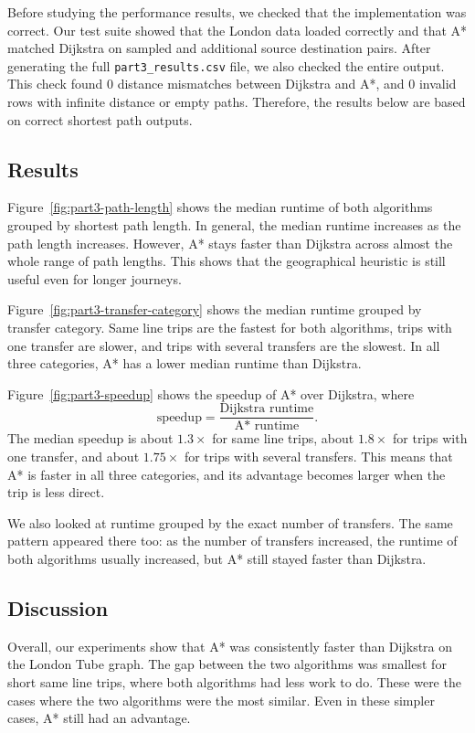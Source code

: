\documentclass[letterpaper]{article}
\theoremstyle{plain}
\theoremstyle{definition}
\theoremstyle{remark}
\newcounter{experiment}
\begin{document}
Before studying the performance results, we checked that the implementation was correct. Our test suite showed 
that the London data loaded correctly and that A* matched Dijkstra on sampled and additional 
source destination pairs. After generating the full \texttt{part3\_results.csv} file, we also checked the 
entire output. This check found \(0\) distance mismatches between Dijkstra and A*, and \(0\) invalid rows 
with infinite distance or empty paths. Therefore, the results below are based on correct shortest path outputs.

\subsection*{Results}
Figure~\ref{fig:part3-path-length} shows the median runtime of both algorithms grouped by shortest path length. 
In general, the median runtime increases as the path length increases. However, A* stays faster than Dijkstra 
across almost the whole range of path lengths. This shows that the geographical heuristic is still useful even 
for longer journeys.

Figure~\ref{fig:part3-transfer-category} shows the median runtime grouped by transfer category. Same line trips 
are the fastest for both algorithms, trips with one transfer are slower, and trips with several transfers are 
the slowest. In all three categories, A* has a lower median runtime than Dijkstra.

Figure~\ref{fig:part3-speedup} shows the speedup of A* over Dijkstra, where
\[
\text{speedup} = \frac{\text{Dijkstra runtime}}{\text{A* runtime}}.
\]
The median speedup is about \(1.3\times\) for same line trips, about \(1.8\times\) for trips with one transfer, 
and about \(1.75\times\) for trips with several transfers. This means that A* is faster in all three categories, 
and its advantage becomes larger when the trip is less direct.

We also looked at runtime grouped by the exact number of transfers. The same pattern appeared there too: as 
the number of transfers increased, the runtime of both algorithms usually increased, but A* still stayed faster 
than Dijkstra.

\subsection*{Discussion}
Overall, our experiments show that A* was consistently faster than Dijkstra on the London Tube graph. The gap 
between the two algorithms was smallest for short same line trips, where both algorithms had less work to do. 
These were the cases where the two algorithms were the most similar. Even in these simpler cases, A* still had 
an advantage.
\end{document}
